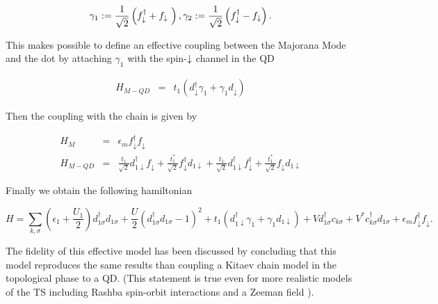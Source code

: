 $$\gamma_1 := \frac{1}{\sqrt{2}} \left( f^\dagger_{\downarrow} + f_{\downarrow}\ \right) , \gamma_2 := \frac{1}{\sqrt{2}} \left( f^\dagger_{\downarrow} - f_{\downarrow} \right).$$

This makes possible to define an effective coupling between the Majorana Mode and the dot by attaching $\gamma_1$ with the spin-$\downarrow$ channel in the QD

\begin{eqnarray}
H_{M-QD} & = &  t_1 \left(d_{\downarrow}^{\dagger}\gamma_{1}+\gamma_{1}d_{\downarrow}\right) 
\label{eq:MajoranaCoupling}
\end{eqnarray}





Then the coupling with the chain is given by 

\begin{eqnarray*}
H_{M} & = & \epsilon_{m}f_{\downarrow}^{\dagger}f_{\downarrow}\\
H_{M-QD}&=&\frac{t_1}{\sqrt{2}}d_{1\downarrow}^{\dagger}f_{\downarrow}+\frac{t_1^{*}}{\sqrt{2}}f_{\downarrow}^{\dagger}d_{1\downarrow}+\frac{t_1}{\sqrt{2}}d_{1\downarrow}^{\dagger}f_{\downarrow}^{\dagger}+\frac{t_1^{*}}{\sqrt{2}}f_{\downarrow}d_{1\downarrow}
\end{eqnarray*}

Finally we obtain the following hamiltonian

\begin{equation}
H =\sum_{k,\sigma}\left(\epsilon_1+\frac{U_1}{2}\right)d_{1\sigma}^{\dagger}d_{1\sigma}+ \frac{U}{2}(d_{1\sigma}^{\dagger}d_{1\sigma}-1)^{2} + t_1 \left(d_{1\downarrow}^{\dagger}\gamma_{1}+\gamma_{1}d_{1\downarrow}\right) + Vd^\dagger_{1\sigma}c_{k\sigma}+V^* c^\dagger_{k\sigma}d_{1\sigma}+ \epsilon_{m}f_{\downarrow}^{\dagger}f_{\downarrow}.
\label{eq:QD-Mham}
\end{equation}


The fidelity of this effective model has been discussed by \citet{ruiz-tijerina_interaction_2015}
concluding that this model reproduces the
same results than coupling a  Kitaev chain model in the topological phase to a QD.
(This statement is true even for more realistic models of the TS including Rashba spin-orbit interactions and a Zeeman field \citep{ruiz-tijerina_interaction_2015}
).\\


